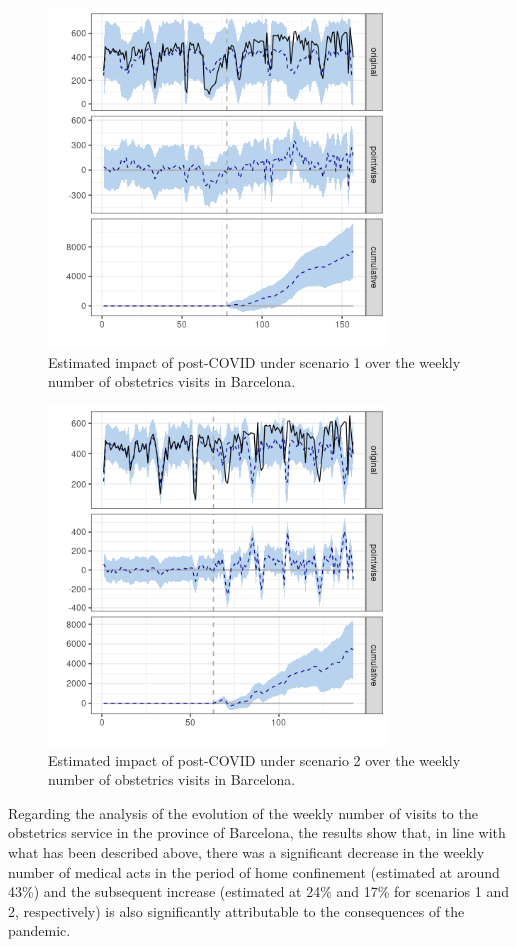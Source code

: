 \documentclass[9pt]{osa-supplemental-document}
\begin{document}
\begin{center}
\begin{figure}[H]
\includegraphics[width=9cm]{obstetrics_post_scen1_Barcelona.png}\caption{Estimated impact of post-COVID under scenario 1 over the weekly number of obstetrics visits in Barcelona.}
\end{figure}
\end{center}

\begin{center}
  \begin{figure}[H]
    \includegraphics[width=9cm]{obstetrics_post_scen2_Barcelona.png}\caption{Estimated impact of post-COVID under scenario 2 over the weekly number of obstetrics visits in Barcelona.}
  \end{figure}
  \end{center}

Regarding the analysis of the evolution of the weekly number of visits to the obstetrics service in the province of Barcelona, the results show that, in line with what has been described above, there was a significant decrease in the weekly number of medical acts in the period of home confinement (estimated at around 43\%) and the subsequent increase (estimated at 24\% and 17\% for scenarios 1 and 2, respectively) is also significantly attributable to the consequences of the pandemic.
\end{document}
